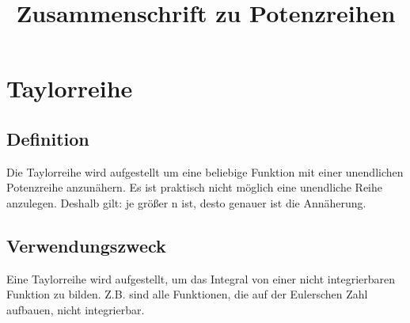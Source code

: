 \documentclass[a4paper,10pt]{article}
\title{Zusammenschrift zu Potenzreihen}
\begin{document}
\maketitle
\thispagestyle{fancy}

\section{Taylorreihe}
\subsection{Definition}
\label{sec:taylordefinition}
Die Taylorreihe wird aufgestellt um eine beliebige Funktion mit einer
unendlichen Potenzreihe anzunähern. Es ist praktisch nicht möglich
eine unendliche Reihe anzulegen. Deshalb gilt: je größer n ist, desto
genauer ist die Annäherung.

\subsection{Verwendungszweck}
Eine Taylorreihe wird aufgestellt, um das Integral von einer nicht
integrierbaren Funktion zu bilden. Z.B. sind alle Funktionen, die auf
der Eulerschen Zahl aufbauen, nicht integrierbar.
\end{document}
